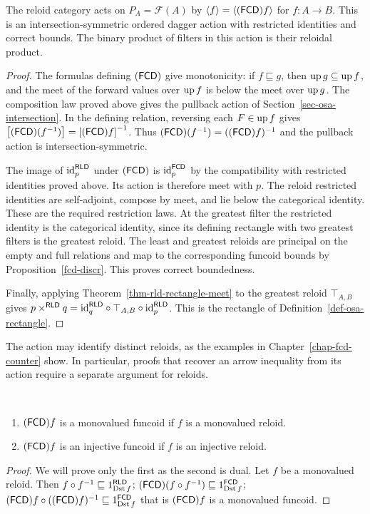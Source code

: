 \begin{prop}\label{prop-rld-osa}
The reloid category acts on $P_A=\mathscr F(A)$ by
$\left\langle f\right\rangle=\left\langle (\mathsf{FCD}) f\right\rangle$ for $f:A\to B$. This is an
intersection-symmetric ordered dagger action with restricted
identities and correct bounds. The binary product of filters
in this action is their reloidal product.
\end{prop}
\begin{proof}
The formulas defining $(\mathsf{FCD})$ give monotonicity: if
$f\sqsubseteq g$, then $\operatorname{up} g\subseteq\operatorname{up} f$, and the meet of the
forward values over $\operatorname{up} f$ is below the meet over $\operatorname{up} g$.
The composition law proved above gives the pullback action of
Section~\ref{sec-osa-intersection}. In the defining relation,
reversing each $F\in\operatorname{up} f$ gives
$\mathord{\mathrel{\left[(\mathsf{FCD})(f^{-1})\right]}}=\mathord{\mathrel{\left[(\mathsf{FCD}) f\right]}}^{-1}$.
Thus $(\mathsf{FCD})(f^{-1})=((\mathsf{FCD}) f)^{-1}$ and the pullback action
is intersection-symmetric.

The image of ${\operatorname{id}}_p^{\mathsf{RLD}}$ under $(\mathsf{FCD})$ is
${\operatorname{id}}_p^{\mathsf{FCD}}$ by the compatibility with restricted
identities proved above. Its action is therefore meet with $p$.
The reloid restricted identities are self-adjoint, compose by
meet, and lie below the categorical identity. These are the
required restriction laws. At the greatest filter the restricted
identity is the categorical identity, since its defining
rectangle with two greatest filters is the greatest reloid.
The least and greatest reloids are principal on the empty
and full relations and map to the corresponding funcoid bounds
by Proposition~\ref{fcd-discr}. This proves correct boundedness.

Finally, applying Theorem~\ref{thm-rld-rectangle-meet} to the
greatest reloid $\top_{A,B}$ gives
$p\times^{\mathsf{RLD}}q=
{\operatorname{id}}_q^{\mathsf{RLD}}\circ\top_{A,B}\circ{\operatorname{id}}_p^{\mathsf{RLD}}$.
This is the rectangle of Definition~\ref{def-osa-rectangle}.
\end{proof}

The action may identify distinct reloids, as the examples in
Chapter~\ref{chap-fcd-counter} show. In particular, proofs that
recover an arrow inequality from its action require a separate
argument for reloids.

\begin{prop}
~
\begin{enumerate}
\item $(\mathsf{FCD}) f$ is a monovalued funcoid if $f$ is a monovalued reloid.
\item $(\mathsf{FCD}) f$ is an injective funcoid if $f$ is an injective reloid.
\end{enumerate}
\end{prop}
\begin{proof}
We will prove only the first as the second is dual. Let $f$ be a
monovalued reloid. Then $f\circ f^{-1}\sqsubseteq1_{\operatorname{Dst} f}^{\mathsf{RLD}}$;
$(\mathsf{FCD})(f\circ f^{-1})\sqsubseteq1_{\operatorname{Dst} f}^{\mathsf{FCD}}$; $(\mathsf{FCD}) f\circ((\mathsf{FCD}) f)^{-1}\sqsubseteq1_{\operatorname{Dst} f}^{\mathsf{FCD}}$
that is $(\mathsf{FCD}) f$ is a monovalued funcoid.\end{proof}

